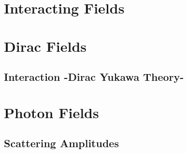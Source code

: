 \documentclass[12pt]{article}
\newcommand{\myqftsrcdirectory}[0]{myqft/src}
\newcommand{\mainqftsrcdirectory}[0]{src_qft}
\newcommand{\srcseventeen}[0]{myqft/versions/2017}
\begin{document}
\section{Interacting Fields}

%

\label{sec:InteractingFields2}
%


\newpage
\section{Dirac Fields}
%
%


\subsection{Interaction -Dirac Yukawa Theory-}
\label{sec:DiracYukawa}




\begin{comment}
\subsection{Majorana Field}
Massless, spin1/2, selfconjugate.
\begin{equation}
i \slashed{\partial} \psi(x) = 0\,,
\hspace{3mm}
\bar{\psi}(x) i \stackrel{\leftarrow}{\slashed{\partial}}   = 0
\end{equation}
\end{comment}

\newpage
\section{Photon Fields}
%



\subsection{Scattering Amplitudes}

\end{document}
